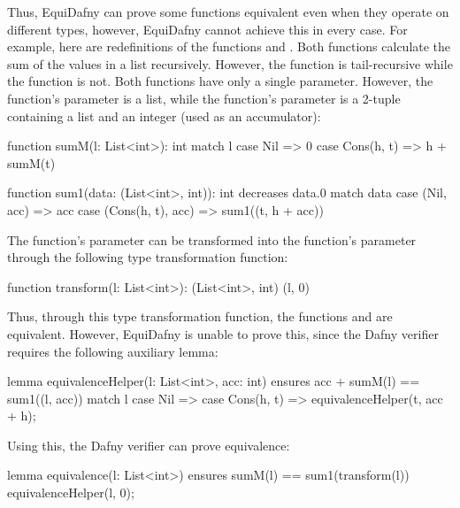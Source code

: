 % 
Thus, EquiDafny can prove some functions equivalent even when they operate on different types, however, EquiDafny cannot achieve this in every case. For example, here are redefinitions of the functions  and . Both functions calculate the sum of the values in a list recursively. However, the  function is tail-recursive while the  function is not. Both functions have only a single parameter. However, the  function's parameter is a list, while the  function's parameter is a 2-tuple containing a list and an integer (used as an accumulator):
\begin{dafny}
function sumM(l: List<int>): int {
  match l {
    case Nil => 0
    case Cons(h, t) => h + sumM(t)
  }
}

function sum1(data: (List<int>, int)): int
  decreases data.0
{
  match data {
    case (Nil, acc) => acc
    case (Cons(h, t), acc) => sum1((t, h + acc))
  }
}
\end{dafny}
%
The  function's parameter can be transformed into the  function's parameter through the following type transformation function:
\begin{dafny}
function transform(l: List<int>): (List<int>, int) {
  (l, 0)
}
\end{dafny}
%
Thus, through this type transformation function, the functions  and  are equivalent. However, EquiDafny is unable to prove this, since the Dafny verifier requires the following auxiliary lemma:
\begin{dafny}
lemma equivalenceHelper(l: List<int>, acc: int)
  ensures acc + sumM(l) == sum1((l, acc))
{
  match l {
    case Nil => {}
    case Cons(h, t) => equivalenceHelper(t, acc + h);
  }
}
\end{dafny}
%
Using this, the Dafny verifier can prove equivalence:
\begin{dafny}
lemma equivalence(l: List<int>)
  ensures sumM(l) == sum1(transform(l))
{
  equivalenceHelper(l, 0);
}
\end{dafny}
%